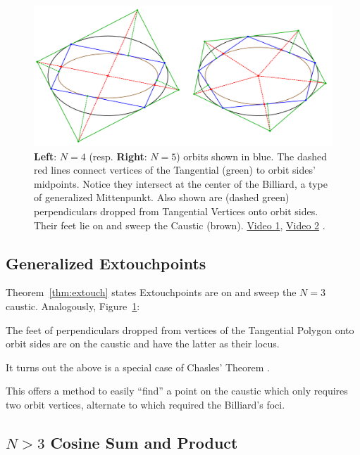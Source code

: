 \begin{figure}
    \centering
    \includegraphics[width=\textwidth]{pics/u0165_extouch.pdf}
    \caption{\textbf{Left}: $N=4$ (resp. \textbf{Right}: $N=5$) orbits shown in blue. The dashed red lines connect vertices of the Tangential (green) to orbit sides' midpoints. Notice they intersect at the center of the Billiard, a type of generalized Mittenpunkt. Also shown are (dashed green) perpendiculars dropped from Tangential Vertices onto orbit sides. Their feet lie on and sweep the Caustic (brown). \href{https://youtu.be/TV2p7fPlYfE}{Video 1}, \href{https://youtu.be/Bpc-MrR2IMc}{Video 2}  \cite[pl\#18,19]{dsr_math_intell_playlist}.}
    \label{fig:gen-mitten}
\end{figure}

\subsection{Generalized Extouchpoints}

Theorem~\ref{thm:extouch} states Extouchpoints are on and sweep the $N=3$ caustic. Analogously, Figure~\ref{fig:gen-mitten}:

\begin{theorem}
The feet of perpendiculars dropped from vertices of the Tangential Polygon onto orbit sides are on the caustic and have the latter as their locus.
\end{theorem}

It turns out the above is a special case of Chasles' Theorem \cite{sergei2016proj}. 

This offers a method to easily ``find'' a point on the caustic which only requires two orbit vertices, alternate to \cite{himmelstrand12} which required the Billiard's foci.

\subsection{$N>3$ Cosine Sum and Product}

